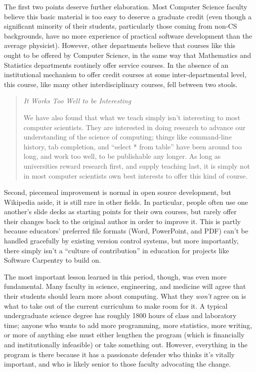 \documentclass{article}
\begin{document}
The first two points deserve further elaboration. Most Computer Science
faculty believe this basic material is too easy to deserve a graduate
credit (even though a significant minority of their students,
particularly those coming from non-CS backgrounds, have no more
experience of practical software development than the average
physicist). However, other departments believe that courses like this
ought to be offered by Computer Science, in the same way that
Mathematics and Statistics departments routinely offer service courses.
In the absence of an institutional mechanism to offer credit courses at
some inter-departmental level, this course, like many other
interdisciplinary courses, fell between two stools.

\begin{quote}
\emph{It Works Too Well to be Interesting}

We have also found that what we teach simply isn't interesting to most
computer scientists. They are interested in doing research to advance
our understanding of the science of computing; things like command-line
history, tab completion, and ``select * from table'' have been around
too long, and work too well, to be publishable any longer. As long as
universities reward research first, and supply teaching last, it is
simply not in most computer scientists own best interests to offer this
kind of course.
\end{quote}

Second, piecemeal improvement is normal in open source development, but
Wikipedia aside, it is still rare in other fields. In particular, people
often use one another's slide decks as starting points for their own
courses, but rarely offer their changes back to the original author in
order to improve it. This is partly because educators' preferred file
formats (Word, PowerPoint, and PDF) can't be handled gracefully by
existing version control systems, but more importantly, there simply
isn't a ``culture of contribution'' in education for projects like
Software Carpentry to build on.

The most important lesson learned in this period, though, was even more
fundamental. Many faculty in science, engineering, and medicine will
agree that their students should learn more about computing. What they
\emph{won't} agree on is what to take out of the current curriculum to
make room for it. A typical undergraduate science degree has roughly
1800 hours of class and laboratory time; anyone who wants to add more
programming, more statistics, more writing, or more of anything else
must either lengthen the program (which is financially and
institutionally infeasible) or take something out. However, everything
in the program is there because it has a passionate defender who thinks
it's vitally important, and who is likely senior to those faculty
advocating the change.
\end{document}
